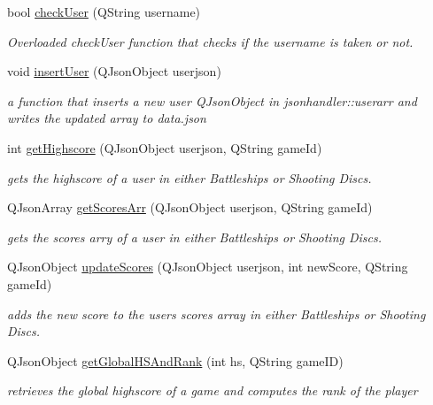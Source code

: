 \begin{DoxyCompactItemize}
bool \hyperlink{classjsonhandler_a3860da83ed54e86300f756f5b66c3d68}{check\+User} (Q\+String username)
\begin{DoxyCompactList}\small\item\em Overloaded check\+User function that checks if the username is taken or not. \end{DoxyCompactList}\item 
void \hyperlink{classjsonhandler_a93f4319d533f65208a05f572b4fd1f76}{insert\+User} (Q\+Json\+Object userjson)
\begin{DoxyCompactList}\small\item\em a function that inserts a new user Q\+Json\+Object in jsonhandler\+::userarr and writes the updated array to data.\+json \end{DoxyCompactList}\item 
int \hyperlink{classjsonhandler_ad1a3458ade52adb1e44fdf147450f60b}{get\+Highscore} (Q\+Json\+Object userjson, Q\+String game\+Id)
\begin{DoxyCompactList}\small\item\em gets the highscore of a user in either Battleships or Shooting Discs. \end{DoxyCompactList}\item 
Q\+Json\+Array \hyperlink{classjsonhandler_aba9044f8e89f6bbe9a136d27062b7358}{get\+Scores\+Arr} (Q\+Json\+Object userjson, Q\+String game\+Id)
\begin{DoxyCompactList}\small\item\em gets the scores arry of a user in either Battleships or Shooting Discs. \end{DoxyCompactList}\item 
Q\+Json\+Object \hyperlink{classjsonhandler_a383b010b1318971dc8170d2744f25342}{update\+Scores} (Q\+Json\+Object userjson, int new\+Score, Q\+String game\+Id)
\begin{DoxyCompactList}\small\item\em adds the new score to the user\textquotesingle{}s scores array in either Battleships or Shooting Discs. \end{DoxyCompactList}\item 
Q\+Json\+Object \hyperlink{classjsonhandler_ab702fe91f4f95c309d7fed4402b05dcc}{get\+Global\+H\+S\+And\+Rank} (int hs, Q\+String game\+ID)
\begin{DoxyCompactList}\small\item\em retrieves the global highscore of a game and computes the rank of the player \end{DoxyCompactList}\item 

\end{DoxyCompactItemize}
